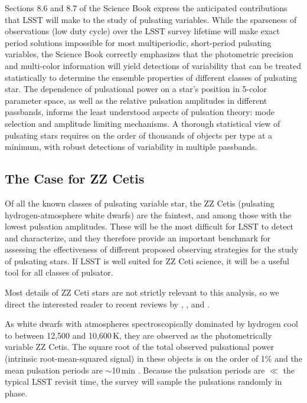 Sections 8.6 and 8.7 of the Science Book express the anticipated contributions that LSST will make to the study of pulsating variables.  While the sparseness of observations (low duty cycle) over the LSST survey lifetime will make exact period solutions impossible for most multiperiodic, short-period pulsating variables, the Science Book correctly emphasizes that the photometric precision and multi-color information will yield detections of variability that can be treated statistically to determine the ensemble properties of different classes of pulsating star.  The dependence of pulsational power on a star's position in 5-color parameter space, as well as the relative pulsation amplitudes in different passbands, informs the least understood aspects of pulsation theory: mode selection and amplitude limiting mechanisms.
A thorough statistical view of pulsating stars requires on the order of thousands of objects per type at a minimum, with robust detections of variability in multiple passbands.

\subsection{The Case for ZZ Cetis}
\label{sec:\secname:targets}

Of all the known classes of pulsating variable star, the ZZ Cetis (pulsating hydrogen-atmosphere white dwarfs) are the faintest, and among those with the lowest pulsation amplitudes.  These will be the most difficult for LSST to detect and characterize, and they therefore provide an important benchmark for assessing the effectiveness of different proposed observing strategies for the study of pulsating stars.  If LSST is well suited for ZZ Ceti science, it will be a useful tool for all classes of pulsator.

Most details of ZZ Ceti stars are not strictly relevant to this analysis, so we direct the interested reader to recent reviews by \citet{2008ARA&A..46..157W}, \citet{2008PASP..120.1043F}, and \citet{2010A&ARv..18..471A}.

As white dwarfs with atmospheres spectroscopically dominated by hydrogen cool to between 12,500 and 10,600\,K, they are observed as the photometrically variable ZZ Cetis.  The square root of the total observed pulsational power (intrinsic root-mean-squared signal) in these objects is on the order of 1\% and the mean pulsation periods are $\sim$10\,min \citep{2006ApJ...640..956M}.  Because the pulsation periods are $\ll$ the typical LSST revisit time, the survey will sample the pulsations randomly in phase. 

